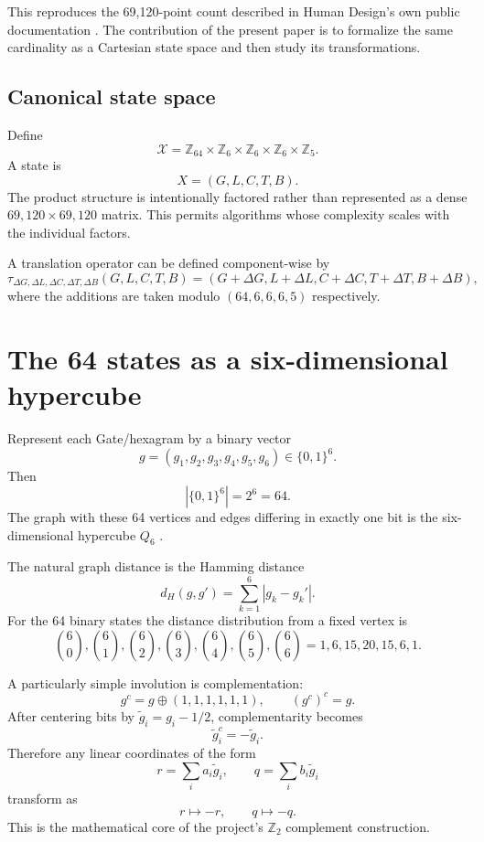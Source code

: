 \documentclass[11pt,a4paper]{article}
\numberwithin{equation}{section}
\newcommand{\Z}{\mathbb{Z}}
\newcommand{\XX}{\mathcal{X}}
\begin{document}
This reproduces the 69,120-point count described in Human Design's own public documentation \citep{JovianArchiveBasics2026}. The contribution of the present paper is to formalize the same cardinality as a Cartesian state space and then study its transformations.

\subsection{Canonical state space}

Define
\begin{equation}
\XX=\Z_{64}\times\Z_6\times\Z_6\times\Z_6\times\Z_5.
\label{eq:X}
\end{equation}
A state is
\[
X=(G,L,C,T,B).
\]
The product structure is intentionally factored rather than represented as a dense $69,120\times69,120$ matrix. This permits algorithms whose complexity scales with the individual factors.

A translation operator can be defined component-wise by
\begin{equation}
\tau_{\Delta G,\Delta L,\Delta C,\Delta T,\Delta B}
(G,L,C,T,B)
=
(G+\Delta G, L+\Delta L, C+\Delta C,T+\Delta T,B+\Delta B),
\end{equation}
where the additions are taken modulo $(64,6,6,6,5)$ respectively.

\section{The 64 states as a six-dimensional hypercube}
\label{sec:hypercube}

Represent each Gate/hexagram by a binary vector
\begin{equation}
 g=(g_1,g_2,g_3,g_4,g_5,g_6)\in\{0,1\}^6.
\end{equation}
Then
\[
|\{0,1\}^6|=2^6=64.
\]
The graph with these 64 vertices and edges differing in exactly one bit is the six-dimensional hypercube $Q_6$ \citep{Coxeter1973,Harary1972}.

The natural graph distance is the Hamming distance
\begin{equation}
 d_H(g,g')=\sum_{k=1}^{6}|g_k-g_k'|.
\end{equation}
For the 64 binary states the distance distribution from a fixed vertex is
\[
\binom{6}{0},\binom{6}{1},\binom{6}{2},\binom{6}{3},\binom{6}{4},\binom{6}{5},\binom{6}{6}
=
1,6,15,20,15,6,1.
\]

A particularly simple involution is complementation:
\begin{equation}
 g^c=g\oplus(1,1,1,1,1,1),
\qquad
(g^c)^c=g.
\end{equation}
After centering bits by $\tilde g_i=g_i-1/2$, complementarity becomes
\begin{equation}
 \tilde g_i^c=-\tilde g_i.
\end{equation}
Therefore any linear coordinates of the form
\begin{equation}
 r=\sum_i a_i\tilde g_i,
 \qquad
 q=\sum_i b_i\tilde g_i
\end{equation}
transform as
\[
 r\mapsto-r,
 \qquad
 q\mapsto-q.
\]
This is the mathematical core of the project's $\mathbb Z_2$ complement construction.
\end{document}
